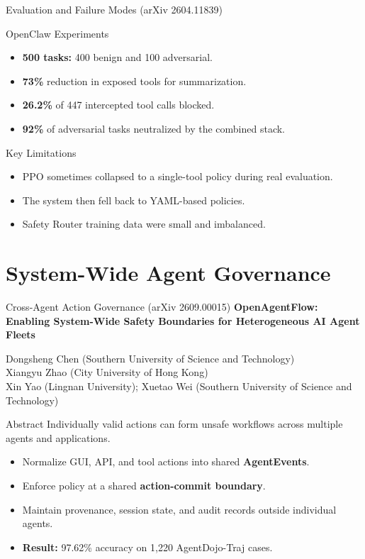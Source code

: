 \documentclass[aspectratio=169]{beamer}
\begin{document}
\begin{frame}{Evaluation and Failure Modes (arXiv 2604.11839)}
    \begin{block}{OpenClaw Experiments}
        \begin{itemize}
            \item \textbf{500 tasks:} 400 benign and 100 adversarial.
            \item \textbf{73\%} reduction in exposed tools for summarization.
            \item \textbf{26.2\%} of 447 intercepted tool calls blocked.
            \item \textbf{92\%} of adversarial tasks neutralized by the combined stack.
        \end{itemize}
    \end{block}
    \begin{alertblock}{Key Limitations}
        \begin{itemize}
            \item PPO sometimes collapsed to a single-tool policy during real evaluation.
            \item The system then fell back to YAML-based policies.
            \item Safety Router training data were small and imbalanced.
        \end{itemize}
    \end{alertblock}
\end{frame}

\section{System-Wide Agent Governance}
\begin{frame}{Cross-Agent Action Governance (arXiv 2609.00015)}
    \footnotesize
    \textbf{OpenAgentFlow: Enabling System-Wide Safety Boundaries for Heterogeneous AI Agent Fleets}

    {\scriptsize Dongsheng Chen (Southern University of Science and Technology)\\Xiangyu Zhao (City University of Hong Kong)\\Xin Yao (Lingnan University); Xuetao Wei (Southern University of Science and Technology)}
    \begin{block}{Abstract}
        Individually valid actions can form unsafe workflows across multiple agents and applications.
    \end{block}
    \begin{itemize}
        \item Normalize GUI, API, and tool actions into shared \textbf{AgentEvents}.
        \item Enforce policy at a shared \textbf{action-commit boundary}.
        \item Maintain provenance, session state, and audit records outside individual agents.
        \item \textbf{Result:} 97.62\% accuracy on 1,220 AgentDojo-Traj cases.
    \end{itemize}
\end{frame}
\end{document}
